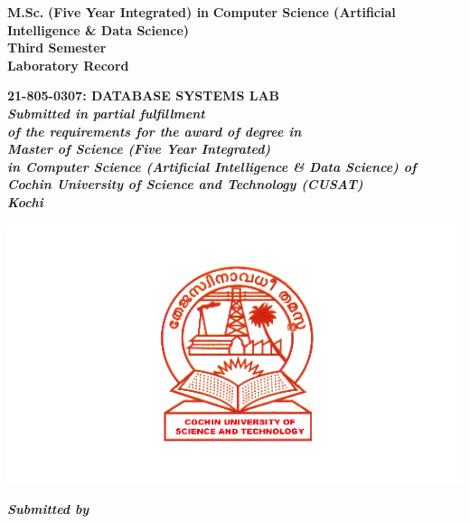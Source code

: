 \documentclass[a4paper,12pt]{report}
\begin{document}
	\begin{center}
		\vspace{12pt}
		\Large\textbf{M.Sc.}
		\Large\textbf{(Five Year Integrated) in}
		\Large\textbf{Computer Science  (Artificial Intelligence \& Data Science)\\}
		\vspace{30pt}
		\Large\textbf{Third Semester}
		\vspace*{50pt}
		\textbf{\\ Laboratory Record}
		\vspace{5pt}
		
		\Large\textbf{21-805-0307: DATABASE SYSTEMS LAB\\ }
		\vspace*{40pt}
		\small\textit{\textbf{Submitted in partial fulfillment\\ of the requirements for the award of degree in \\ Master of Science (Five Year Integrated)\\in Computer Science (Artificial Intelligence \& Data Science) of \\ Cochin University of Science and Technology (CUSAT) \\ Kochi\\ }}
		\vspace*{10pt}
		\begin{center}
		\includegraphics[scale=0.5]{cusat.png}	
		\end{center}
		
		\vspace*{0pt}
		\begin{center}
		\textbf{\textit{Submitted by\hspace{350pt}}}
		\end{center}



\end{center}
\end{document}
